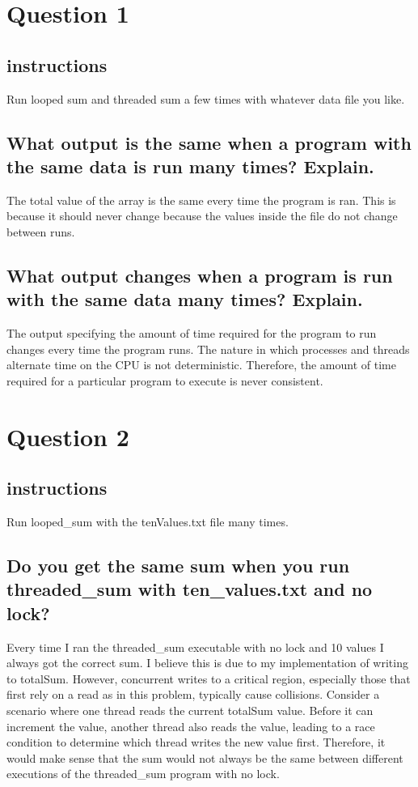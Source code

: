 \documentclass{assignment-x}
\begin{document}
\maketitle
\pagebreak

\section{Question 1}
\subsection{instructions}
Run looped sum and threaded sum a few times with whatever data file you like.
\subsection{What output is the same when a program with the same data is run many times? Explain.}
The total value of the array is the same every time the program is ran. This is because it should never change because the values inside the file do not change between runs.
\subsection{What output changes when a program is run with the same data many times? Explain.}
The output specifying the amount of time required for the program to run changes every time the program runs. The nature in which processes and threads alternate time on the CPU is not deterministic. Therefore, the amount of time required for a particular program to execute is never consistent.

\section{Question 2}
\subsection{instructions}
Run looped\_sum with the tenValues.txt file many times.
\subsection{Do you get the same sum when you run threaded\_sum with ten\_values.txt and no lock?}
Every time I ran the threaded\_sum executable with no lock and 10 values I always got the correct sum. I believe this is due to my implementation of writing to totalSum. However, concurrent writes to a critical region, especially those that first rely on a read as in this problem, typically cause collisions.  Consider a scenario where one thread reads the current totalSum value. Before it can increment the value, another thread also reads the value, leading to a race condition to determine which thread writes the new value first. Therefore, it would make sense that the sum would not always be the same between different executions of the threaded\_sum program with no lock.
\end{document}
